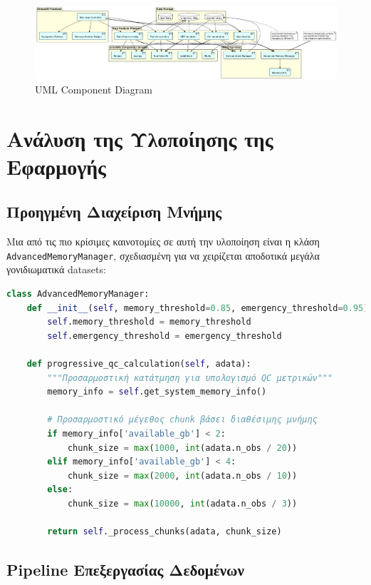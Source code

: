 \documentclass[11pt,a4paper]{article}
\begin{document}
\begin{figure}[H]
    \centering
    \includegraphics[width=1.0\linewidth]{UML_Component_Diagram.png}
    \caption{UML Component Diagram}
    \label{fig:component_diagram}
\end{figure}
\section{Ανάλυση της Υλοποίησης της Εφαρμογής}

\subsection{Προηγμένη Διαχείριση Μνήμης}

Μια από τις πιο κρίσιμες καινοτομίες σε αυτή την υλοποίηση είναι η κλάση \texttt{AdvancedMemoryManager}, σχεδιασμένη για να χειρίζεται αποδοτικά μεγάλα γονιδιωματικά datasets:

\begin{lstlisting}[language=Python, caption={Υλοποίηση Προηγμένης Διαχείρισης Μνήμης}]
class AdvancedMemoryManager:
    def __init__(self, memory_threshold=0.85, emergency_threshold=0.95):
        self.memory_threshold = memory_threshold
        self.emergency_threshold = emergency_threshold
    
    def progressive_qc_calculation(self, adata):
        """Προσαρμοστική κατάτμηση για υπολογισμό QC μετρικών"""
        memory_info = self.get_system_memory_info()
        
        # Προσαρμοστικό μέγεθος chunk βάσει διαθέσιμης μνήμης
        if memory_info['available_gb'] < 2:
            chunk_size = max(1000, int(adata.n_obs / 20))
        elif memory_info['available_gb'] < 4:
            chunk_size = max(2000, int(adata.n_obs / 10))
        else:
            chunk_size = max(10000, int(adata.n_obs / 3))
        
        return self._process_chunks(adata, chunk_size)
\end{lstlisting}

\subsection{Pipeline Επεξεργασίας Δεδομένων}
\end{document}
